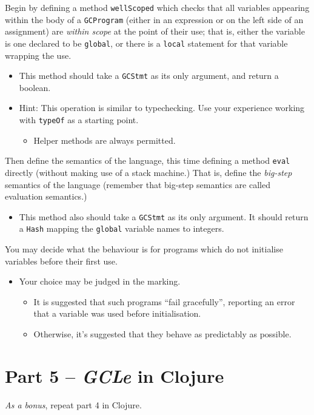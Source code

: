 \documentclass[11pt]{article}
\theoremstyle{definition}
\begin{document}
Begin by defining a method \texttt{wellScoped} which checks that
all variables appearing within the body of a \texttt{GCProgram}
(either in an expression or on the left side of an assignment)
are \emph{within scope} at the point of their use;
that is, either the variable is one declared to be \texttt{global},
or there is a \texttt{local} statement for that variable wrapping the use.
\begin{itemize}
\item This method should take a \texttt{GCStmt} as its only argument,
and return a boolean.
\item Hint: This operation is similar to typechecking.
Use your experience working with \texttt{typeOf} as a starting point.
\begin{itemize}
\item Helper methods are always permitted.
\end{itemize}
\end{itemize}

Then define the semantics of the language,
this time defining a method \texttt{eval} directly
(without making use of a stack machine.)
That is, define the \emph{big-step} semantics of the language
(remember that big-step semantics are called evaluation semantics.)
\begin{itemize}
\item This method also should take a \texttt{GCStmt} as its only argument.
It should return a \texttt{Hash} mapping the \texttt{global} variable names
to integers.
\end{itemize}

You may decide what the behaviour is for programs which
do not initialise variables before their first use.
\begin{itemize}
\item Your choice may be judged in the marking.
\begin{itemize}
\item It is suggested that such programs “fail gracefully”,
reporting an error that a variable was used before initialisation.
\item Otherwise, it's suggested that they behave as predictably as possible.
\end{itemize}
\end{itemize}

\section*{Part 5 – \emph{GCLe} in Clojure}
\label{sec:org8220426}
\emph{As a bonus}, repeat part 4 in Clojure.
\end{document}
